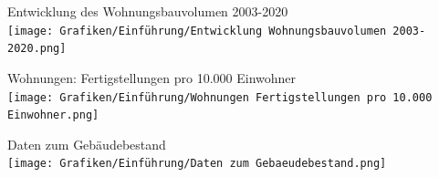 \documentclass[fleqn,twoside,dvipsnames]{article}
\begin{document}
\begin{itemize}
\begin{minipage}{0.5\textwidth}
            \end{minipage}
            \begin{minipage}{0.5\textwidth}
                \item Entwicklung des Wohnungsbauvolumen 2003-2020\\
                        \texttt{[image: Grafiken/Einführung/Entwicklung Wohnungsbauvolumen 2003-2020.png]}
                \item Wohnungen: Fertigstellungen pro 10.000 Einwohner\\
                        \texttt{[image: Grafiken/Einführung/Wohnungen Fertigstellungen pro 10.000 Einwohner.png]}
                \item Daten zum Gebäudebestand\\
                    \texttt{[image: Grafiken/Einführung/Daten zum Gebaeudebestand.png]}
            \end{minipage}
        \end{itemize}
                        
\end{document}
